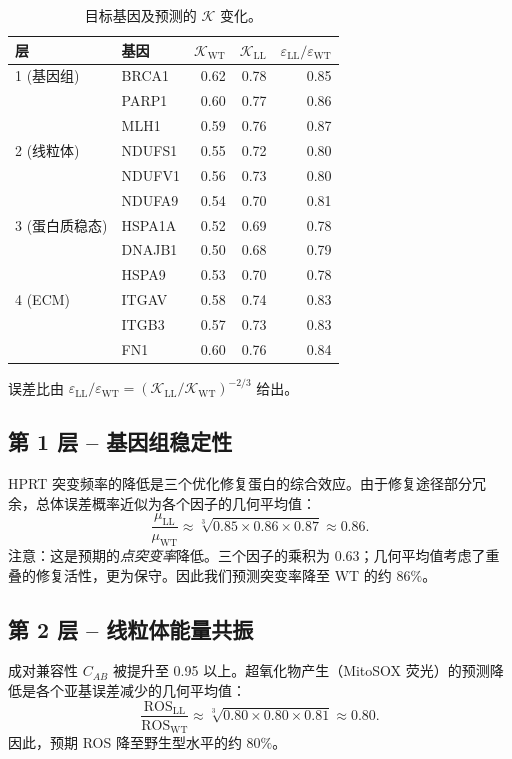 \documentclass[12pt,a4paper]{article}
\newcommand{\REL}{\mathcal{K}}          %
\begin{document}
	\begin{table}[H]
		\centering
		\caption{目标基因及预测的 \(\REL\) 变化。}
		\label{tab:targets}
		\begin{tabular}{@{}llrrr@{}}
			\toprule
			\textbf{层} & \textbf{基因} & \(\REL_{\mathrm{WT}}\) & \(\REL_{\mathrm{LL}}\) & \(\varepsilon_{\mathrm{LL}}/\varepsilon_{\mathrm{WT}}\) \\
			\midrule
			1 (基因组) & BRCA1 & 0.62 & 0.78 & 0.85 \\
			& PARP1 & 0.60 & 0.77 & 0.86 \\
			& MLH1  & 0.59 & 0.76 & 0.87 \\
			2 (线粒体)   & NDUFS1 & 0.55 & 0.72 & 0.80 \\
			& NDUFV1 & 0.56 & 0.73 & 0.80 \\
			& NDUFA9 & 0.54 & 0.70 & 0.81 \\
			3 (蛋白质稳态) & HSPA1A & 0.52 & 0.69 & 0.78 \\
			& DNAJB1 & 0.50 & 0.68 & 0.79 \\
			& HSPA9  & 0.53 & 0.70 & 0.78 \\
			4 (ECM)    & ITGAV  & 0.58 & 0.74 & 0.83 \\
			& ITGB3  & 0.57 & 0.73 & 0.83 \\
			& FN1    & 0.60 & 0.76 & 0.84 \\
			\bottomrule
		\end{tabular}
		\footnotesize 误差比由 \(\varepsilon_{\mathrm{LL}}/\varepsilon_{\mathrm{WT}} = (\REL_{\mathrm{LL}}/\REL_{\mathrm{WT}})^{-2/3}\) 给出。
	\end{table}
	
	\subsection{第 1 层 – 基因组稳定性}
	HPRT 突变频率的降低是三个优化修复蛋白的综合效应。由于修复途径部分冗余，总体误差概率近似为各个因子的几何平均值：
	\[
	\frac{\mu_{\mathrm{LL}}}{\mu_{\mathrm{WT}}} \approx \sqrt[3]{0.85 \times 0.86 \times 0.87} \approx 0.86.
	\]
	注意：这是预期的\textit{点突变率}降低。三个因子的乘积为 \(0.63\)；几何平均值考虑了重叠的修复活性，更为保守。因此我们预测突变率降至 WT 的约 \(86\%\)。
	
	\subsection{第 2 层 – 线粒体能量共振}
	成对兼容性 \(C_{AB}\) 被提升至 0.95 以上。超氧化物产生（MitoSOX 荧光）的预测降低是各个亚基误差减少的几何平均值：
	\[
	\frac{\mathrm{ROS}_{\mathrm{LL}}}{\mathrm{ROS}_{\mathrm{WT}}} \approx \sqrt[3]{0.80 \times 0.80 \times 0.81} \approx 0.80.
	\]
	因此，预期 ROS 降至野生型水平的约 \(80\%\)。
	
\end{document}
